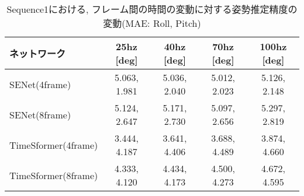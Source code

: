 \begin{table}[htbp]
\begin{center}
\caption{Sequence1における, フレーム間の時間の変動に対する姿勢推定精度の変動(MAE: Roll, Pitch)}
  \begin{tabular}{l || c | c | c | c}\hline
      ネットワーク &  25hz [deg]& 40hz [deg] & 70hz [deg] & 100hz [deg]\\ \hline
    SENet(4frame) & 5.063, 1.981 & 5.036, 2.040 & 5.012, 2.023 & 5.126, 2.148 \\
    SENet(8frame) & 5.124, 2.647 & 5.171, 2.730 & 5.097, 2.656 & 5.297, 2.819 \\ \hline
    TimeSformer(4frame) & 3.444, 4.187 & 3.641, 4.406 & 3.688, 4.489 & 3.874, 4.660 \\
    TimeSformer(8frame) & 4.333, 4.120 & 4.434, 4.173 & 4.500, 4.273 & 4.672, 4.595 \\ \hline
  \end{tabular}
  \label{tab:MAE_frame_infer_2}
\end{center}
\end{table}


